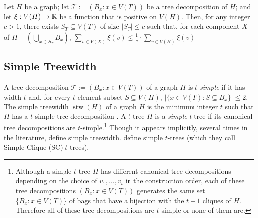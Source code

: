 \documentclass[kpfonts]{patmorin}
\DeclareMathOperator{\stw}{stw}
\theoremstyle{named}
\begin{document}
\begin{lem}\label{weighted-separator}
    Let $H$ be a graph; let $\mathcal{T}:=(B_x:x\in V(T))$ be a tree decomposition of $H$; and let $\xi:V(H)\to\mathbb{R}$ be a function that is positive on $V(H)$.  Then, for any integer $c>1$, there exists $S_T\subseteq V(T)$ of size $|S_T|\le c$ such that, for each component $X$ of $H-(\bigcup_{x\in S_T} B_x)$, $\sum_{v\in V(X)} \xi(v) \le \tfrac{1}{c}\cdot\sum_{v\in V(H)} \xi(v)$
\end{lem}

%

\subsection{Simple Treewidth}


A tree decomposition $\mathcal{T}:=(B_x:x\in V(T))$ of a graph $H$ is \emph{$t$-simple} if it has width $t$ and, for every $t$-element subset $S\subseteq V(H)$, $|\{x\in V(T):S\subseteq B_x\}|\le 2$.  The simple treewidth $\stw(H)$ of a graph $H$ is the minimum integer $t$ such that $H$ has a $t$-simple tree decomposition \cite{knauer.ueckerdt:simple}.  A $t$-tree $H$ is a \emph{simple} $t$-tree if its canonical tree decompositions are $t$-simple.\footnote{Although a simple $t$-tree $H$ has different canonical tree decompositions depending on the choice of $v_1,\ldots,v_t$ in the construction order, each of these tree decompositions $(B_x:x\in V(T))$ generates the same set $\{B_x:x\in V(T)\}$ of bags that have a bijection with the $t+1$ cliques of $H$.  Therefore all of these tree decompositions are $t$-simple or none of them are.}  Though it appears implicitly, several times in the literature, \citet{knauer.ueckerdt:simple} define simple treewidth.  \citet{markenzon.justel.ea:subclasses} define simple $t$-trees (which they call Simple Clique (SC) $t$-trees).
\end{document}
